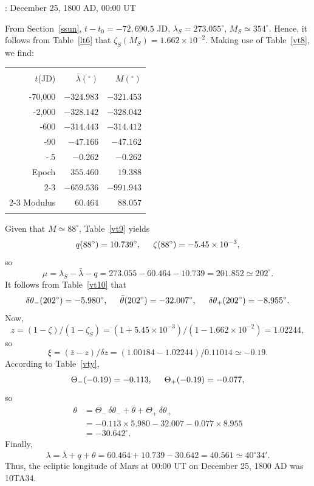 \begin{center}
: December 25, 1800 AD, 00:00 UT
\end{center}
From Section~\ref{ssun}, $t-t_0=-72,690.5$ JD, $\lambda_S= 273.055^\circ$, $M_S\simeq 354^\circ$. Hence, it follows from Table~\ref{lt6} that
$\zeta_S(M_S)= 1.662\times 10^{-2}$. Making use of
Table~\ref{vt8}, we find:
\begin{center}
\begin{tabular}{rrr}
&&\\
$t$(JD) & $\bar{\lambda}(^\circ)$ & $ M(^\circ)$\\[-2ex]
&&\\
-70,000 & $-324.983$ & $-321.453$\\
-2,000 & $-328.142$ & $-328.042$\\
-600 & $-314.443$ & $-314.412$\\
-90 & $-47.166$ & $-47.162$\\
-.5 & $-0.262$ & $-0.262$\\
Epoch & $355.460$ & $19.388$\\\cline{2-3}
&$-659.536$ & $-991.943$\\\cline{2-3}
Modulus & $60.464$ & $88.057$\\
&&\\
\end{tabular}
\end{center}
Given that $M\simeq 88^\circ$, Table~\ref{vt9} yields 
$$
q(88^\circ)= 10.739^\circ, \mbox{\hspace{0.5cm}}\zeta(88^\circ)=-5.45\times 10^{-3},
$$
so
$$
\mu=\lambda_S - \bar{\lambda}-q = 273.055-60.464-10.739= 201.852\simeq202^\circ.
$$
It follows from Table~\ref{vt10}
that 
$$
\delta\theta_-(202^\circ) = -5.980^\circ,\mbox{\hspace{0.5cm}}\bar{\theta}(202^\circ)=-32.007^\circ,\mbox{\hspace{0.5cm}}\delta\theta_+(202^\circ) = -8.955^\circ.
$$
Now, 
$$
z= (1-\zeta)/(1-\zeta_S) = (1+5.45\times 10^{-3})/(1-1.662\times 10^{-2}) =
1.02244,
$$
so
$$
\xi = (\bar{z}-z)/\delta z = (1.00184-1.02244)/0.11014 \simeq -0.19.
$$ 
According to Table~\ref{vty}, 
$$
\Theta_-(-0.19) = -0.113, \mbox{\hspace{0.5cm}}
\Theta_+(-0.19) = -0.077,
$$
so
\begin{align*}
\theta & = \Theta_-\,\delta\theta_- + \bar{\theta}+\Theta_+\,\delta\theta_+ \\[0.5ex]
&= -0.113\times 5.980-32.007-0.077\times 8.955 \\[0.5ex]
&= -30.642^\circ.
\end{align*}
Finally,
$$
\lambda=\bar{\lambda} + q + \theta= 60.464+10.739-30.642 = 40.561 \simeq 40^\circ 34'.
$$ 
Thus,
the ecliptic longitude of Mars at 00:00 UT on December 25, 1800 AD was 10TA34.

